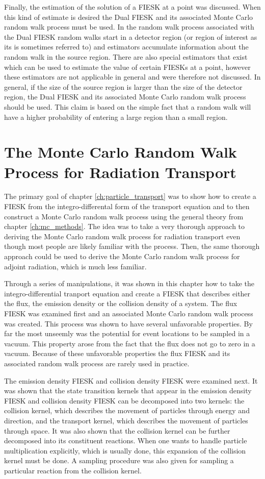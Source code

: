 Finally, the estimation of the solution of a FIESK at a point was discussed. 
When this kind of estimate is desired the Dual FIESK and its associated Monte 
Carlo random walk process must be used. In the random walk process associated
with the Dual FIESK random walks start in a detector region (or region of
interest as its is sometimes referred to) and estimators accumulate information
about the random walk in the source region. There are also special estimators 
that exist which can be used to estimate the value of certain FIESKs at a point,
however these estimators are not applicable in general and were therefore not 
discussed. In general, if the size of the source region is larger than the size 
of the detector region, the Dual FIESK and its associated Monte Carlo random 
walk process should be used. This claim is based on the simple fact that a 
random walk will have a higher probability of entering a large region than a 
small region. 

\section{The Monte Carlo Random Walk Process for Radiation Transport}
The primary goal of chapter \ref{ch:particle_transport} was to show how to 
create a FIESK from the integro-differental form of the transport equation and 
to then construct a Monte Carlo random walk process using the general theory 
from chapter \ref{ch:mc_methods}. The idea was to take a very thorough approach 
to deriving the Monte Carlo random walk process for radiation transport even 
though most people are likely familiar with the process. Then, the same thorough
approach could be used to derive the Monte Carlo random walk process for 
adjoint radiation, which is much less familiar. 

Through a series of manipulations, it was shown in this chapter how to take
the integro-differential tranport equation and create a FIESK that describes
either the flux, the emission density or the collision density of a system. 
The flux FIESK was examined first and an associated Monte Carlo random walk
process was created. This process was shown to have several unfavorable
properties. By far the most unseemly was the potential for event locations
to be sampled in a vacuum. This property arose from the fact that the flux
does not go to zero in a vacuum. Because of these unfavorable properties
the flux FIESK and its associated random walk process are rarely used in
practice. 

The emission density FIESK and collision density FIESK were examined next. It
was shown that the state transition kernels that appear in the emission density
FIESK and collision density FIESK can be decomposed into two kernels: the
collision kernel, which describes the movement of particles through energy
and direction, and the transport kernel, which describes the movement of 
particles through space. It was also shown that the collision kernel can be
further decomposed into its constituent reactions. When one wants to handle
particle multiplication explicitly, which is usually done, this expansion of
the collision kernel must be done. A sampling procedure was also given for
sampling a particular reaction from the collision kernel.

